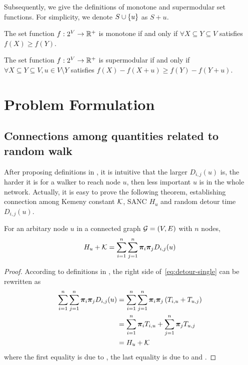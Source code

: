 \documentclass[sigconf]{acmart}
\begin{document}
Subsequently, we give the definitions of monotone and supermodular set functions. For simplicity, we denote \(S\cup\left\{u \right\}\) as \(S+u\).

\begin{definition}[Monotonicity]
    The set function \(f:2^{V}\to\mathbb{R}^+\) is monotone if and only if \(\forall X\subseteq Y\subseteq V\) satisfies \(f(X)\ge f(Y)\).
\end{definition}

\begin{definition}[Supermodularity]
    The set function \(f:2^{V}\to\mathbb{R}^+\) is supermodular if and only if \(\forall X\subseteq Y\subseteq V, u\in V\setminus Y\) satisfies \(f(X)-f(X+u)\ge f(Y)-f(Y+u)\).
\end{definition}

\section{Problem Formulation}\label{sec:prob-form}

\subsection{Connections among quantities related to random walk}

After proposing definitions in , it is intuitive that the larger \(D_{i,j}(u)\) is, the harder it is for a walker to reach node \(u\), then less important \(u\) is in the whole network.
Actually, it is easy to prove the following theorem, establishing connection among Kemeny constant \(\mathcal{K}\), SANC \(H_u\) and random detour time \(D_{i,j}(u)\).
\begin{theorem}\label{thm:connection-single}
    For an arbitary node \(u\) in a connected graph \(\mathcal{G}=(V,E)\) with \(n\) nodes,
    \begin{equation}\label{eq:detour-single}
        H_u+\mathcal{K}=\sum_{i=1}^n\sum_{j=1}^n\boldsymbol{\pi}_i\boldsymbol{\pi}_jD_{i,j}(u)
    \end{equation}
\end{theorem}
\begin{proof}
    According to definitions in , the right side of~\eqref{eq:detour-single} can be rewritten as
    \begin{align*}
        \sum_{i=1}^n\sum_{j=1}^n\boldsymbol{\pi}_i\boldsymbol{\pi}_jD_{i,j}(u) & =\sum_{i=1}^n\sum_{j=1}^n\boldsymbol{\pi}_i\boldsymbol{\pi}_j\left( T_{i,u}+T_{u,j} \right) \\
                                                           & =\sum_{i=1}^n\boldsymbol{\pi}_iT_{i,u}+\sum_{j=1}^n\boldsymbol{\pi}_jT_{u,j}         \\
                                                           & =H_u+\mathcal{K}
    \end{align*}
    where the first equality is due to , the last equality is due to  and .
\end{proof}
\end{document}
